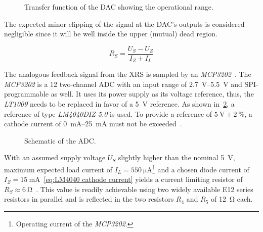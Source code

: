             \begin{figure}[h]
                \centering
                
                \caption[Transfer function of the DAC showing the operational range]{Transfer function of the DAC showing the operational range.}%
                \label{fig:transfer function DAC}
            \end{figure}

            The expected minor clipping of the signal at the DAC's outputs is considered negligible since it will be well inside the upper (mutual) dead region.

            \begin{equation}
                R_S = \frac{U_S - U_Z}{I_Z + I_L}
                \label{eq:LM4040 cathode current}
            \end{equation}

            The analogous feedback signal from the XRS is sampled by an \textit{MCP3202}~\cite{Manual.ADC.MCP3202}.
            The \textit{MCP3202} is a \qty{12}{\bit} two-channel ADC with an input range of \qtyrange{2.7}{5.5}{\volt} and SPI-programmable as well.
            It uses its power supply as its voltage reference, thus, the \textit{LT1009} needs to be replaced in favor of a \qty{5}{\volt} reference.
            As shown in~\cref{fig:ADC schematic}, a reference of type \textit{LM4040DIZ-5.0} is used.
            To provide a reference of \(\qty{5}{\volt} \pm \qty{2}{\percent}\), a cathode current of \qtyrange{0}{25}{\milli\ampere} must not be exceeded~\cite{Manual.LM4040PrecisionMicropowerShuntVoltageReference}.

            \begin{figure}[h]
                \centering
                
                \caption[Schematic of the ADC]{Schematic of the ADC.}%
                \label{fig:ADC schematic}
            \end{figure}

            With an assumed supply voltage \(U_S\) slightly higher than the nominal \qty{5}{\volt}, maximum expected load current of \(I_L = \qty{550}{\uA}\)\footnote{Operating current of the \textit{MCP3202}.} and a chosen diode current of \(I_Z = \qty{15}{\milli\ampere}\)~\cref{eq:LM4040 cathode current} yields a current limiting resistor of \(R_S \approx \qty{6}{\ohm}\)~\cite{Manual.LM4040PrecisionMicropowerShuntVoltageReference}.
            This value is readily achievable using two widely available E12 series resistors in parallel and is reflected in the two resistors \(R_4\) and \(R_5\) of \qty{12}{\ohm} each.\par\medskip

